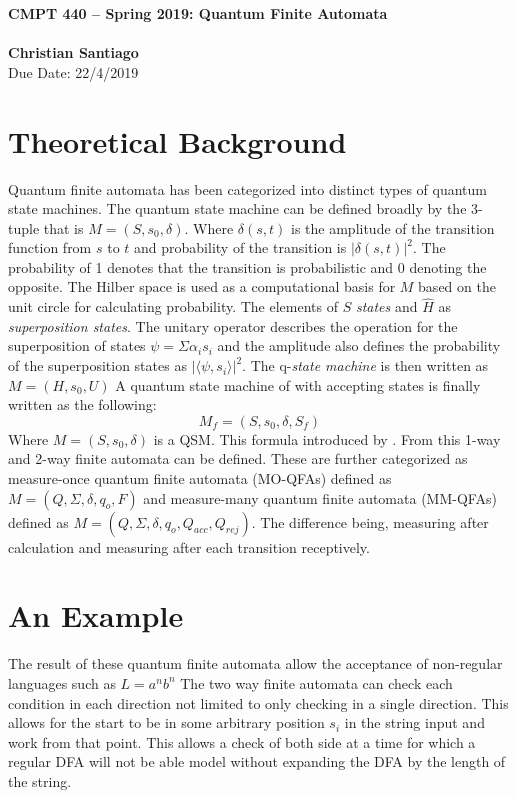 \documentclass[letter, 12pt]{article}
\begin{document}
\noindent
\large\textbf{CMPT 440 -- Spring 2019: Quantum Finite Automata} \\ \\
\textbf{Christian Santiago} \\
\normalsize   Due Date: 22/4/2019


\section*{Theoretical Background}
Quantum finite automata has been categorized into distinct types of quantum state machines. The  quantum state machine can be defined broadly by the 3-tuple that is $M = (S, s_0,\delta)$. Where $\delta(s,t)$ is the amplitude of the transition function from $s$ to $t$ and probability of the transition is $|\delta(s,t)|^2$. The probability of 1 denotes that the transition is probabilistic and 0 denoting the opposite. The Hilber space is used as a computational basis for $M$ based on the unit circle for calculating probability. The elements of $S$ \emph{states} and $\hat{H}$ as \emph{superposition states}. The unitary operator describes the operation for the superposition of states $\psi = \Sigma \alpha_i s_i$ and the amplitude also defines the probability of the superposition states as $|\langle \psi , s_i \rangle|^2$. The q-\emph{state machine} is then written as $M = (H, s_0, U)$ A quantum state machine of with accepting states is finally written as the following:
\begin{equation}
    M_f = (S, s_0,\delta, S_f)
\end{equation}
Where $M = (S, s_0,\delta)$ is a QSM.
This formula introduced by \cite{Gudder2000}. From this 1-way and 2-way finite automata can be defined. These are further categorized as measure-once quantum finite automata (MO-QFAs) defined as $M = (Q, \Sigma,\delta, q_o, F)$  and measure-many quantum finite automata (MM-QFAs) defined as $M = (Q, \Sigma,\delta, q_o, Q_{acc}, Q_{rej})$. The difference being, measuring after calculation and measuring after each transition receptively. \cite{Brodsky}

\section*{An Example}
The result of these quantum finite automata allow the acceptance of non-regular languages such as $L = a^nb^n$ The two way finite automata can check each condition in each direction not limited to only checking in a single direction. This allows for the start to be in some arbitrary position $s_i$ in the string input and work from that point. This allows a check of both side at a time for which a regular DFA will not be able model without expanding the DFA by the length of the string.






\end{document}
